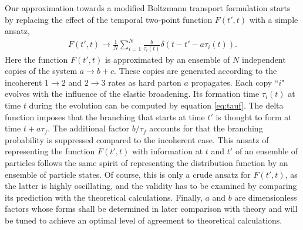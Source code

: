 \documentclass[aps, prc, reprint, amsmath, groupedaddress, nofootinbib]{revtex4-1}
\begin{document}
Our approximation towards a modified Boltzmann transport formulation starts by replacing the effect of the temporal two-point function $F(t',t)$ with a simple ansatz,
\begin{eqnarray}
F(t', t) \rightarrow \frac{1}{N}\sum_{i=1}^N \frac{b}{\tau_i(t)} \delta(t-t'- a \tau_i(t)).
\label{eq:ansatz}
\end{eqnarray}
Here the function $F(t', t)$ is approximated by an ensemble of $N$ independent copies of the system $a\rightarrow b+c$.
These copies are generated according to the incoherent $1\rightarrow 2$ and $2\rightarrow 3$ rates as hard parton $a$ propagates.
Each copy ``$i$" evolves with the influence of the elastic broadening. 
Its formation time $\tau_i(t)$ at time $t$ during the evolution can be computed by equation \ref{eq:tauf}.
The delta function imposes that the branching that starts at time $t'$  is thought to form at time $t+a\tau_f$.
The additional factor $b/\tau_f$ accounts for that the branching probability is suppressed compared to the incoherent case.
This ansatz of representing the function $F(t', t)$ with information at $t$ and $t'$ of an ensemble of particles follows the same spirit of representing the distribution function by an ensemble of particle states.
Of course, this is only a crude ansatz for $F(t', t)$, as the latter is highly oscillating, and the validity has to be examined by comparing its prediction with the theoretical calculations.
Finally, $a$ and $b$ are dimensionless factors whose forms shall be determined in later comparison with theory and will be tuned to achieve an optimal level of agreement to theoretical calculations.
\end{document}
